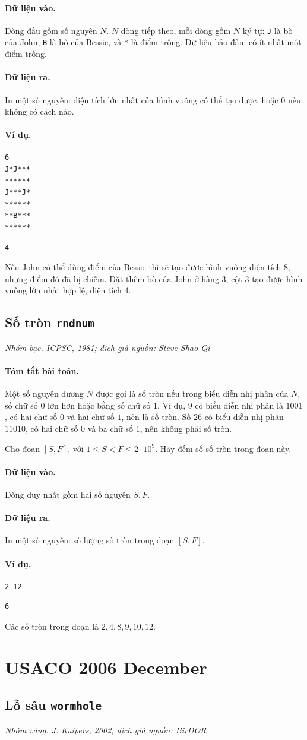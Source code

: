 \documentclass[11pt]{article}
\newcommand{\problem}[4]{%
  \subsection[#1 (#2)]{#1 \hfill {\normalsize\texttt{#2}}}%
  \noindent\textit{#3. #4}\par\smallskip
}
\newcommand{\iosec}[1]{\paragraph{#1}}
\begin{document}
\iosec{Dữ liệu vào.}
Dòng đầu gồm số nguyên \(N\). \(N\) dòng tiếp theo, mỗi dòng gồm \(N\) ký tự:
\texttt{J} là bò của John, \texttt{B} là bò của Bessie, và \texttt{*} là điểm
trống. Dữ liệu bảo đảm có ít nhất một điểm trống.

\iosec{Dữ liệu ra.}
In một số nguyên: diện tích lớn nhất của hình vuông có thể tạo được, hoặc
\(0\) nếu không có cách nào.

\iosec{Ví dụ.}
\begin{verbatim}
6
J*J***
******
J***J*
******
**B***
******
\end{verbatim}

\begin{verbatim}
4
\end{verbatim}

Nếu John có thể dùng điểm của Bessie thì sẽ tạo được hình vuông diện tích
\(8\), nhưng điểm đó đã bị chiếm. Đặt thêm bò của John ở hàng \(3\), cột \(3\)
tạo được hình vuông lớn nhất hợp lệ, diện tích \(4\).

\problem{Số tròn}{rndnum}{Nhóm bạc}{ICPSC, 1981; dịch giả nguồn: Steve Shao Qi}

\iosec{Tóm tắt bài toán.}
Một số nguyên dương \(N\) được gọi là số tròn nếu trong biểu diễn nhị phân của
\(N\), số chữ số \(0\) lớn hơn hoặc bằng số chữ số \(1\). Ví dụ, \(9\) có biểu
diễn nhị phân là \(1001\), có hai chữ số \(0\) và hai chữ số \(1\), nên là số
tròn. Số \(26\) có biểu diễn nhị phân \(11010\), có hai chữ số \(0\) và ba
chữ số \(1\), nên không phải số tròn.

Cho đoạn \([S,F]\), với \(1\le S<F\le 2\cdot 10^9\). Hãy đếm số số tròn trong
đoạn này.

\iosec{Dữ liệu vào.}
Dòng duy nhất gồm hai số nguyên \(S,F\).

\iosec{Dữ liệu ra.}
In một số nguyên: số lượng số tròn trong đoạn \([S,F]\).

\iosec{Ví dụ.}
\begin{verbatim}
2 12
\end{verbatim}

\begin{verbatim}
6
\end{verbatim}

Các số tròn trong đoạn là \(2,4,8,9,10,12\).

\section{USACO 2006 December}

\problem{Lỗ sâu}{wormhole}{Nhóm vàng}{J. Kuipers, 2002; dịch giả nguồn: BirDOR}
\end{document}
